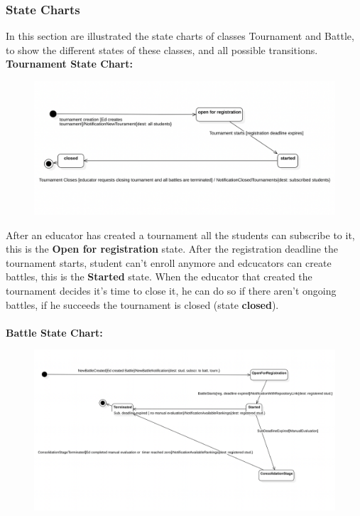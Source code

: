 \subsubsection{State Charts}
In this section are illustrated the state charts of classes Tournament and Battle, to show the different states of these classes, and all possible transitions.\\

\textbf{Tournament State Chart:}
\begin{figure}[h]
    \centering
    \includegraphics[width=1\textwidth]{2Overall_Description/res/st1.png}
\end{figure}

After an educator has created a tournament all the students can subscribe to it, this is the \textbf{Open for registration} state. After the registration deadline the tournament starts, student can't enroll anymore and edcucators can create battles, this is the \textbf{Started} state. When the educator that created the tournament decides it's time to close it, he can do so if there aren't ongoing battles, if he succeeds the tournament is closed (state \textbf{closed}).\\
\\
\clearpage
\textbf{Battle State Chart:}
\begin{figure}[h]
    \centering
    \includegraphics[width=1\textwidth]{2Overall_Description/res/stateChartBattle.png}
\end{figure}

